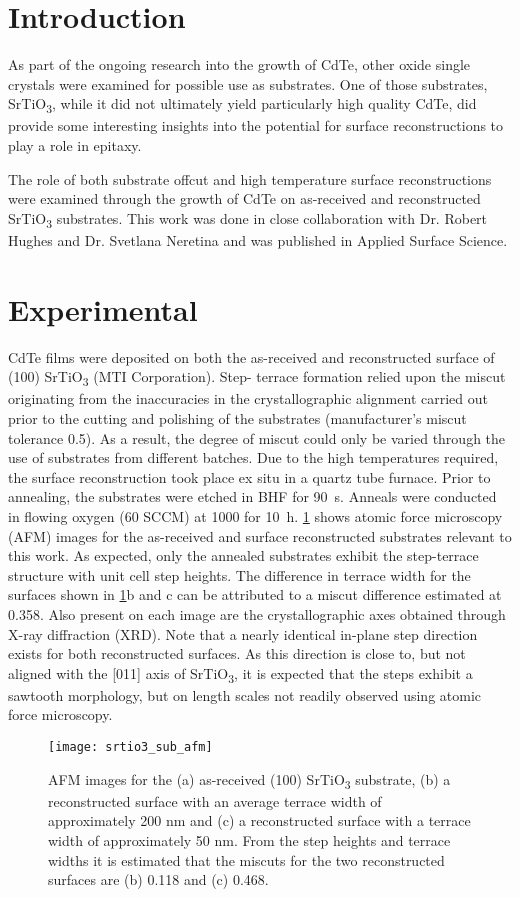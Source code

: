 \section{Introduction}
As part of the ongoing research into the growth of CdTe, other oxide single crystals were examined for possible use as substrates.
One of those substrates, SrTiO\textsubscript{3}, while it did not ultimately yield particularly high quality CdTe, did provide some interesting insights into the potential for surface reconstructions to play a role in epitaxy.

The role of both substrate offcut and high temperature surface reconstructions were examined through the growth of CdTe on as-received and reconstructed SrTiO\textsubscript{3} substrates.
This work was done in close collaboration with Dr.
Robert Hughes and Dr.
Svetlana Neretina and was published in Applied Surface Science\cite{Neretina2009a}.
\section{Experimental}
CdTe films were deposited on both the as-received and reconstructed surface of (100) SrTiO\textsubscript{3} (MTI Corporation).
Step- terrace formation relied upon the miscut originating from the inaccuracies in the crystallographic alignment carried out prior to the cutting and polishing of the substrates (manufacturer’s miscut tolerance 0.5\degree{}).
As a result, the degree of miscut could only be varied through the use of substrates from different batches.
Due to the high temperatures required, the surface reconstruction took place ex situ in a quartz tube furnace.
Prior to annealing, the substrates were etched in BHF for 90~s.
Anneals were conducted in flowing oxygen (60 SCCM) at 1000\celsius{} for 10~h.
\cref{fig:srtio3_sub_afm} shows atomic force microscopy (AFM) images for the as-received and surface reconstructed substrates relevant to this work.
As expected, only the annealed substrates exhibit the step-terrace structure with unit cell step heights.
The difference in terrace width for the surfaces shown in \cref{fig:srtio3_sub_afm}b and c can be attributed to a miscut difference estimated at 0.358\degree{}.
Also present on each image are the crystallographic axes obtained through X-ray diffraction (XRD).
Note that a nearly identical in-plane step direction exists for both reconstructed surfaces.
As this direction is close to, but not aligned with the [011] axis of SrTiO\textsubscript{3}, it is expected that the steps exhibit a sawtooth morphology, but on length scales not readily observed using atomic force microscopy.
\begin{figure}
 \centering \texttt{[image: srtio3\_sub\_afm]}
 \caption[AFM of SrTiO\textsubscript{3} surfaces]{\label{fig:srtio3_sub_afm}AFM images for the (a) as-received (100) SrTiO\textsubscript{3} substrate, (b) a reconstructed surface with an average terrace width of approximately 200 nm and (c) a reconstructed surface with a terrace width of approximately 50 nm.
  From the step heights and terrace widths it is estimated that the miscuts for the two reconstructed surfaces are (b) 0.118\degree{} and (c) 0.468\degree{}.}
\end{figure}

